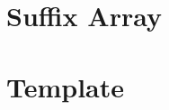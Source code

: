\documentclass{article}
\begin{document}
%


%

\section{Suffix Array}

\pagebreak

\section{Template}

\pagebreak
\end{document}
